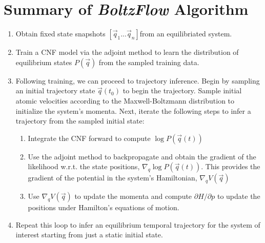 \documentclass[a4paper,11pt]{article}
\begin{document}
\section{Summary of \textit{BoltzFlow} Algorithm}
\begin{enumerate}
    \item Obtain fixed state snapshots $[\vec{q}_1...\vec{q}_n]$from an equilibriated system.
    \item Train a CNF model via the adjoint method to learn the distribution of equilibrium states $P(\vec{q})$ from the sampled training data.
    \item Following training, we can proceed to trajectory inference. Begin by sampling an initial trajectory state $\vec{q}(t_0)$ to begin the trajectory. Sample initial atomic velocities according to the Maxwell-Boltzmann distribution to initialize the system's momenta. Next, iterate the following steps to infer a trajectory from the sampled initial state:
        \begin{enumerate}
            \item Integrate the CNF forward to compute $\log{P(\vec{q}(t))}$
            \item Use the adjoint method to backpropagate and obtain the gradient of the likelihood w.r.t. the state positions, $\nabla_q\log{P(\vec{q}(t))}$. This provides the gradient of the potential in the system's Hamiltonian, $\nabla_qV(\vec{q})$
            \item Use  $\nabla_qV(\vec{q})$ to update the momenta and compute $\partial H/\partial p$ to update the positions under Hamilton's equations of motion.
        \end{enumerate}
    \item Repeat this loop to infer an equilibrium temporal trajectory for the system of interest starting from just a static initial state.
\end{enumerate}
\end{document}
